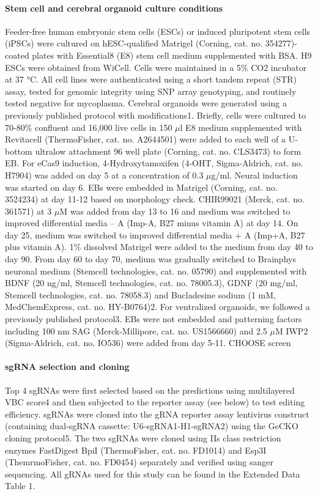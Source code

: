 \paragraph{Stem cell and cerebral organoid culture conditions}
Feeder-free human embryonic stem cells (ESCs) or induced pluripotent stem cells (iPSCs) were cultured on hESC-qualified Matrigel (Corning, cat. no. 354277)-coated plates with Essential8 (E8) stem cell medium supplemented with BSA. H9 ESCs were obtained from WiCell. Cells were maintained in a 5\% CO2 incubator at 37 °C. All cell lines were authenticated using a short tandem repeat (STR) assay, tested for genomic integrity using SNP array genotyping, and routinely tested negative for mycoplasma.
Cerebral organoids were generated using a previously published protocol with modifications1. Briefly, cells were cultured to 70-80\% confluent and 16,000 live cells in 150 $\mu$l E8 medium supplemented with Revitacell (ThermoFisher, cat. no. A2644501) were added to each well of a U-bottom ultralow attachment 96 well plate (Corning, cat. no. CLS3473) to form EB. For eCas9 induction, 4-Hydroxytamoxifen (4-OHT, Sigma-Aldrich, cat. no. H7904) was added on day 5 at a concentration of 0.3 $\mu$g/ml. Neural induction was started on day 6. EBs were embedded in Matrigel (Corning, cat. no. 3524234) at day 11-12 based on morphology check. CHIR99021 (Merck, cat. no. 361571) at 3 $\mu$M was added from day 13 to 16 and medium was switched to improved differential media – A (Imp-A, B27 minus vitamin A) at day 14. On day 25, medium was switched to improved differential media + A (Imp+A, B27 plus vitamin A). 1\% dissolved Matrigel were added to the medium from day 40 to day 90. From day 60 to day 70, medium was gradually switched to Brainphys neuronal medium (Stemcell technologies, cat. no. 05790) and supplemented with BDNF (20 ng/ml, Stemcell technologies, cat. no. 78005.3), GDNF (20 mg/ml, Stemcell technologies, cat. no. 78058.3) and Bucladesine sodium (1 mM, MedChemExpress, cat. no. HY-B0764)2. For ventralized organoids, we followed a previously published protocol3. EBs were not embedded and patterning factors including 100 nm SAG (Merck-Millipore, cat. no. US1566660) and 2.5 $\mu$M IWP2 (Sigma-Aldrich, cat. no. IO536)  were added from day 5-11.
CHOOSE screen

\paragraph{sgRNA selection and cloning}
Top 4 sgRNAs were first selected based on the predictions using multilayered VBC score4 and then subjected to the reporter assay (see below) to test editing efficiency. sgRNAs were cloned into the gRNA reporter assay lentivirus construct (containing dual-sgRNA cassette: U6-sgRNA1-H1-sgRNA2) using the GeCKO cloning protocol5. The two sgRNAs were cloned using IIs class restriction enzymes FastDigest BpiI (ThermoFisher, cat. no. FD1014) and Esp3I (ThemrmoFisher, cat. no. FD0454) separately and verified using sanger sequencing. All gRNAs used for this study can be found in the Extended Data Table 1.  


